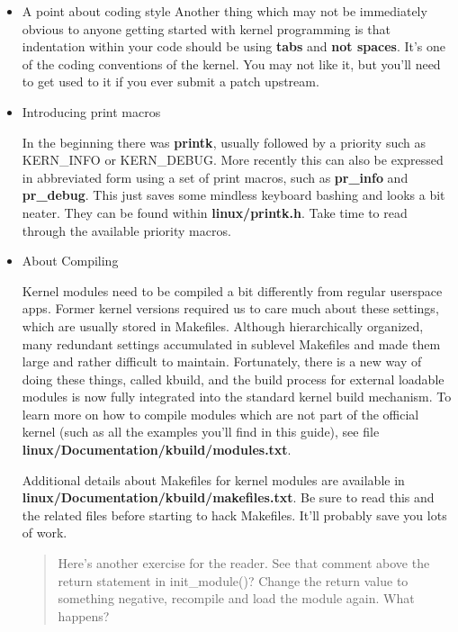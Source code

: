 \documentclass[11pt]{article}
\begin{document}
\begin{itemize}
\item A point about coding style
\label{sec-4-1-0-1}
Another thing which may not be immediately obvious to anyone getting started with kernel programming is that indentation within your code should be using \textbf{tabs} and \textbf{not spaces}. It's one of the coding conventions of the kernel. You may not like it, but you'll need to get used to it if you ever submit a patch upstream.
\item Introducing print macros
\label{sec-4-1-0-2}

In the beginning there was \textbf{printk}, usually followed by a priority such as KERN\_INFO or KERN\_DEBUG. More recently this can also be expressed in abbreviated form using a set of print macros, such as \textbf{pr\_info} and \textbf{pr\_debug}. This just saves some mindless keyboard bashing and looks a bit neater. They can be found within \textbf{linux/printk.h}. Take time to read through the available priority macros.

\item About Compiling
\label{sec-4-1-0-3}

Kernel modules need to be compiled a bit differently from regular userspace apps. Former kernel versions required us to care much about these settings, which are usually stored in Makefiles. Although hierarchically organized, many redundant settings accumulated in sublevel Makefiles and made them large and rather difficult to maintain. Fortunately, there is a new way of doing these things, called kbuild, and the build process for external loadable modules is now fully integrated into the standard kernel build mechanism. To learn more on how to compile modules which are not part of the official kernel (such as all the examples you'll find in this guide), see file \textbf{linux/Documentation/kbuild/modules.txt}.

Additional details about Makefiles for kernel modules are available in \textbf{linux/Documentation/kbuild/makefiles.txt}. Be sure to read this and the related files before starting to hack Makefiles. It'll probably save you lots of work.

\begin{quote}
Here's another exercise for the reader. See that comment above the return statement in init\_module()? Change the return value to something negative, recompile and load the module again. What happens?
\end{quote}
\end{itemize}
\end{document}
